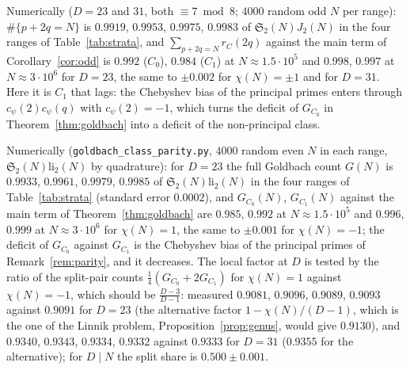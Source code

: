 ﻿\documentclass[11pt]{amsart}
\theoremstyle{remark}
\newcommand{\sS}{\mathfrak S}
\begin{document}
Numerically ($D=23$ and $31$, both $\equiv7\bmod8$; $4000$ random odd $N$ per range): $\#\{p+2q=N\}$ is $0.9919$, $0.9953$, $0.9975$, $0.9983$ of $\sS_2(N)J_2(N)$ in the four ranges of Table~\ref{tab:strata}, and $\sum_{p+2q=N}r_C(2q)$ against the main term of Corollary~\ref{cor:odd} is $0.992$ ($C_0$), $0.984$ ($C_1$) at $N\approx1.5\cdot10^5$ and $0.998$, $0.997$ at $N\approx3\cdot10^6$ for $D=23$, the same to $\pm0.002$ for $\chi(N)=\pm1$ and for $D=31$. Here it is $C_1$ that lags: the Chebyshev bias of the principal primes enters through $c_\psi(2)c_\psi(q)$ with $c_\psi(2)=-1$, which turns the deficit of $G_{C_0}$ in Theorem~\ref{thm:goldbach} into a deficit of the non-principal class.

Numerically (\texttt{goldbach\_class\_parity.py}, $4000$ random even $N$ in each range, $\sS_2(N)\mathrm{li}_2(N)$ by quadrature): for $D=23$ the full Goldbach count $G(N)$ is $0.9933$, $0.9961$, $0.9979$, $0.9985$ of $\sS_2(N)\mathrm{li}_2(N)$ in the four ranges of Table~\ref{tab:strata} (standard error $0.0002$), and $G_{C_0}(N)$, $G_{C_1}(N)$ against the main term of Theorem~\ref{thm:goldbach} are $0.985$, $0.992$ at $N\approx1.5\cdot10^5$ and $0.996$, $0.999$ at $N\approx3\cdot10^6$ for $\chi(N)=1$, the same to $\pm0.001$ for $\chi(N)=-1$; the deficit of $G_{C_0}$ against $G_{C_1}$ is the Chebyshev bias of the principal primes of Remark~\ref{rem:parity}, and it decreases. The local factor at $D$ is tested by the ratio of the split-pair counts $\frac14(G_{C_0}+2G_{C_1})$ for $\chi(N)=1$ against $\chi(N)=-1$, which should be $\frac{D-3}{D-1}$: measured $0.9081$, $0.9096$, $0.9089$, $0.9093$ against $0.9091$ for $D=23$ (the alternative factor $1-\chi(N)/(D-1)$, which is the one of the Linnik problem, Proposition~\ref{prop:genus}, would give $0.9130$), and $0.9340$, $0.9343$, $0.9334$, $0.9332$ against $0.9333$ for $D=31$ ($0.9355$ for the alternative); for $D\mid N$ the split share is $0.500\pm0.001$.
\end{document}
